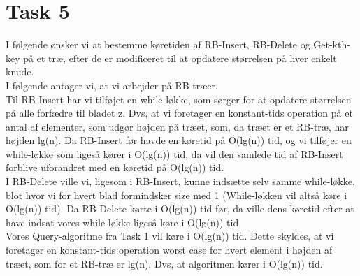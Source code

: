 \section{Task 5}

I følgende ønsker vi at bestemme køretiden af RB-Insert, RB-Delete og Get-kth-key på et træ, efter de er modificeret til at opdatere størrelsen på hver enkelt knude.\\

I følgende antager vi, at vi arbejder på RB-træer.\\

Til RB-Insert har vi tilføjet en while-løkke, som sørger for at
opdatere størrelsen på alle forfædre til bladet z. Dvs, at vi foretager en konstant-tids operation på et antal af elementer, som udgør højden på træet, som, da træet er et RB-træ, har højden lg(n).
Da RB-Insert før havde en køretid på O(lg(n)) tid, og vi tilføjer en while-løkke som ligeså kører i O(lg(n)) tid, da vil den samlede tid af RB-Insert forblive uforandret med en køretid på O(lg(n)) tid. \\

I RB-Delete ville vi, ligesom i RB-Insert, kunne indsætte selv samme while-løkke, blot hvor vi for hvert blad formindsker size med 1 (While-løkken vil altså køre i O(lg(n)) tid). Da RB-Delete kørte i O(lg(n)) tid før, da ville dens køretid efter at have indsat vores while-løkke ligeså køre i O(lg(n)) tid.\\

Vores Query-algoritme fra Task 1 vil køre i O(lg(n)) tid.
Dette skyldes, at vi foretager en konstant-tids operation worst case for hvert element i højden af træet, som for et RB-træ er lg(n). Dvs, at algoritmen kører i O(lg(n)) tid.

